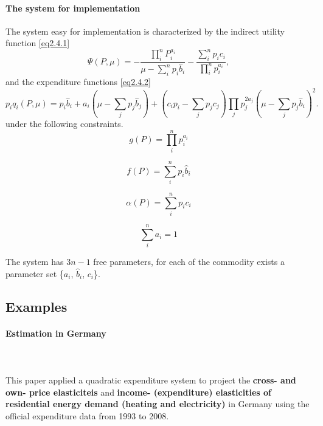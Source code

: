 \paragraph{The system for implementation\\}{
	The system easy for implementation is characterized by the indirect utility function \cref{eq2.4.1} 
	\begin{equation}\label{eq2.4.1}
		\Psi(P,\mu) = -\frac{\prod_i^n P_i^{a_i}}{\mu - \sum_{i}^{n} p_i {\widehat b}_i} - \frac{\sum_{i}^{n} p_i c_i}{\prod_{i}^{n}p_i^{a_i}},
	\end{equation}
	and the expenditure functions \cref{eq2.4.2}
	\begin{equation}\label{eq2.4.2}
		p_i q_i(P,\mu) = p_i \widehat{b}_i + a_i (\mu - \sum_{j} p_j \widehat{b}_j) + (c_i p_i - \sum_{j} p_j c_j) \prod_{j} p_j^{2a_j}(\mu - \sum_j p_j \widehat{b}_i)^2.
	\end{equation}	
	under the following constraints.
	\begin{equation}\label{eq2.4a}
		g(P) = \prod_{i}^{n}p_i^{a_i}
	\end{equation}

	\begin{equation}\label{eq2.4b}
		f(P) = \sum_{i}^{n} p_i \widehat{b}_i
	\end{equation}

	\begin{equation}\label{eq2.4c}
		\alpha (P)= \sum_{i}^{n} p_i c_i
	\end{equation}

	\begin{equation}\label{eq2.4d}
		\sum_{i}^{n} a_i = 1
	\end{equation}

	The system has $3n-1$ free parameters, for each of the commodity exists a parameter set \{$a_i$, $\widehat{b}_i$, $c_i$\}.
 }




\subsection{Examples}
\paragraph{Estimation in Germany\\}{\cite{SCHULTE2017512}\\}

\paragraph{}{This paper applied a quadratic expenditure system to project the \textbf{cross- and own- price elasticiteis} and \textbf{income- (expenditure) elasticities of residential energy demand (heating and electricity)} in Germany using the official expenditure data from 1993 to 2008.}


